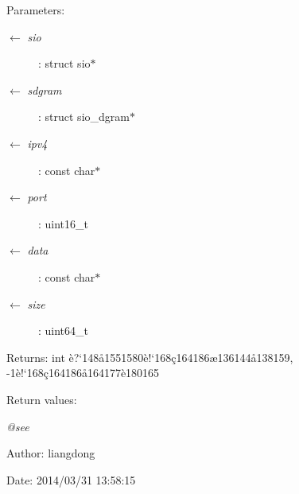 \begin{Desc}
\item[Parameters:]
\begin{description}
\item[\mbox{$\leftarrow$} {\em sio}]: struct sio$\ast$ \item[\mbox{$\leftarrow$} {\em sdgram}]: struct sio\_\-dgram$\ast$ \item[\mbox{$\leftarrow$} {\em ipv4}]: const char$\ast$ \item[\mbox{$\leftarrow$} {\em port}]: uint16\_\-t \item[\mbox{$\leftarrow$} {\em data}]: const char$\ast$ \item[\mbox{$\leftarrow$} {\em size}]: uint64\_\-t \end{description}
\end{Desc}
\begin{Desc}
\item[Returns:]int \`{e}?`148\aa{}1551580\`{e}!`168\c{c}164186\ae{}136144\aa{}138159, -1\`{e}!`168\c{c}164186\aa{}164177\`{e}180165 \end{Desc}
\begin{Desc}
\item[Return values:]
\begin{description}
\item[{\em @see}]\end{description}
\end{Desc}
\begin{Desc}
\item[Author:]liangdong \end{Desc}
\begin{Desc}
\item[Date:]2014/03/31 13:58:15 \end{Desc}
